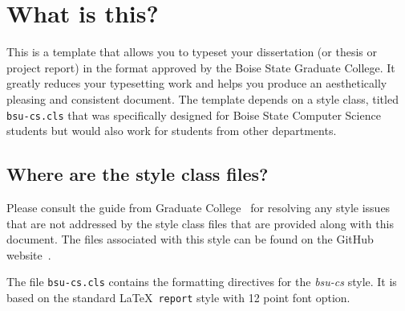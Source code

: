 \documentclass[dissertation]{bsu-cs}  %
\begin{document}
\label{ch:intro}

\section{What is this?}
This is a template that allows you to typeset your dissertation (or thesis or project report)
in the format approved by the Boise State Graduate College. It greatly reduces your typesetting
work and helps you produce an aesthetically pleasing and consistent document. The template
depends on a style class, titled \texttt{bsu-cs.cls} that was specifically designed for Boise
State Computer Science students but would also work for students from other departments.

\subsection{Where are the style class files?}



Please consult the guide from Graduate College~\cite{guide} for resolving any style issues
that are not addressed by the style class files that are provided along with this document. The
files associated with this style can be found on the GitHub website~\cite{mainrepo}.


The file \texttt{bsu-cs.cls} contains the formatting directives for the \emph{bsu-cs} style.
It is based on the standard \LaTeX\ \texttt{report} style with 12 point font option.
\end{document}
